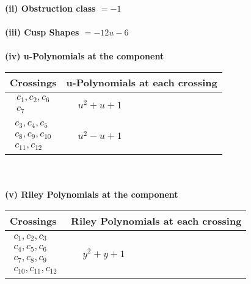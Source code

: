 \documentclass[1p]{elsarticle_modified}
\theoremstyle{definition}
\begin{document}
\flushleft \textbf{(ii) Obstruction class $= -1$}\\~\\
\flushleft \textbf{(iii) Cusp Shapes $= -12 u-6$}\\~\\
\newpage\renewcommand{\arraystretch}{1}
\flushleft \textbf{(iv) u-Polynomials at the component}\newline \\
\begin{tabular}{m{50pt}|m{274pt}}
Crossings & \hspace{64pt}u-Polynomials at each crossing \\
\hline $$\begin{aligned}c_{1},c_{2},c_{6}\\c_{7}\end{aligned}$$&$\begin{aligned}
&u^2+u+1
\end{aligned}$\\
\hline $$\begin{aligned}c_{3},c_{4},c_{5}\\c_{8},c_{9},c_{10}\\c_{11},c_{12}\end{aligned}$$&$\begin{aligned}
&u^2- u+1
\end{aligned}$\\
\hline
\end{tabular}\\~\\
\newpage\renewcommand{\arraystretch}{1}
\flushleft \textbf{(v) Riley Polynomials at the component}\newline \\
\begin{tabular}{m{50pt}|m{274pt}}
Crossings & \hspace{64pt}Riley Polynomials at each crossing \\
\hline $$\begin{aligned}c_{1},c_{2},c_{3}\\c_{4},c_{5},c_{6}\\c_{7},c_{8},c_{9}\\c_{10},c_{11},c_{12}\end{aligned}$$&$\begin{aligned}
&y^2+y+1
\end{aligned}$\\
\hline
\end{tabular}\\~\\
\end{document}
